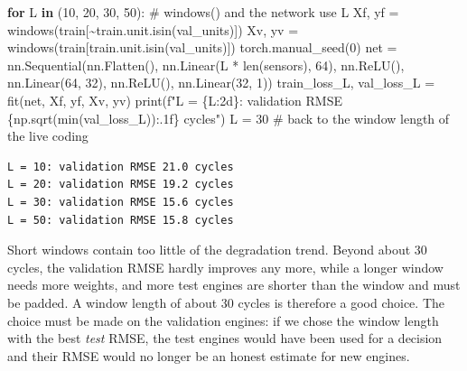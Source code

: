 \documentclass[
  letterpaper,
  DIV=11,
  numbers=noendperiod]{scrreprt}
\newenvironment{Shaded}{\begin{snugshade}}{\end{snugshade}}
\newcommand{\BuiltInTok}[1]{\textcolor[rgb]{0.00,0.23,0.31}{#1}}
\newcommand{\CommentTok}[1]{\textcolor[rgb]{0.37,0.37,0.37}{#1}}
\newcommand{\ControlFlowTok}[1]{\textcolor[rgb]{0.00,0.23,0.31}{\textbf{#1}}}
\newcommand{\DecValTok}[1]{\textcolor[rgb]{0.68,0.00,0.00}{#1}}
\newcommand{\KeywordTok}[1]{\textcolor[rgb]{0.00,0.23,0.31}{\textbf{#1}}}
\newcommand{\NormalTok}[1]{\textcolor[rgb]{0.00,0.23,0.31}{#1}}
\newcommand{\OperatorTok}[1]{\textcolor[rgb]{0.37,0.37,0.37}{#1}}
\newcommand{\SpecialCharTok}[1]{\textcolor[rgb]{0.37,0.37,0.37}{#1}}
\newcommand{\SpecialStringTok}[1]{\textcolor[rgb]{0.13,0.47,0.30}{#1}}
\begin{document}
\begin{tcolorbox}[enhanced jigsaw, left=2mm, title=\textcolor{quarto-callout-caution-color}{\faFire}\hspace{0.5em}{Solution to Exercise 2}, opacityback=0, breakable, rightrule=.15mm, arc=.35mm, toptitle=1mm, colbacktitle=quarto-callout-caution-color!10!white, opacitybacktitle=0.6, coltitle=black, colframe=quarto-callout-caution-color-frame, bottomrule=.15mm, leftrule=.75mm, bottomtitle=1mm, titlerule=0mm, toprule=.15mm, colback=white]

\begin{Shaded}
\begin{Highlighting}[]
\ControlFlowTok{for}\NormalTok{ L }\KeywordTok{in}\NormalTok{ (}\DecValTok{10}\NormalTok{, }\DecValTok{20}\NormalTok{, }\DecValTok{30}\NormalTok{, }\DecValTok{50}\NormalTok{):                       }\CommentTok{\# windows() and the network use L}
\NormalTok{    Xf, yf }\OperatorTok{=}\NormalTok{ windows(train[}\OperatorTok{\textasciitilde{}}\NormalTok{train.unit.isin(val\_units)])}
\NormalTok{    Xv, yv }\OperatorTok{=}\NormalTok{ windows(train[train.unit.isin(val\_units)])}
\NormalTok{    torch.manual\_seed(}\DecValTok{0}\NormalTok{)}
\NormalTok{    net }\OperatorTok{=}\NormalTok{ nn.Sequential(nn.Flatten(), nn.Linear(L }\OperatorTok{*} \BuiltInTok{len}\NormalTok{(sensors), }\DecValTok{64}\NormalTok{), nn.ReLU(),}
\NormalTok{                        nn.Linear(}\DecValTok{64}\NormalTok{, }\DecValTok{32}\NormalTok{), nn.ReLU(), nn.Linear(}\DecValTok{32}\NormalTok{, }\DecValTok{1}\NormalTok{))}
\NormalTok{    train\_loss\_L, val\_loss\_L }\OperatorTok{=}\NormalTok{ fit(net, Xf, yf, Xv, yv)}
    \BuiltInTok{print}\NormalTok{(}\SpecialStringTok{f"L = }\SpecialCharTok{\{}\NormalTok{L}\SpecialCharTok{:2d\}}\SpecialStringTok{: validation RMSE }\SpecialCharTok{\{}\NormalTok{np}\SpecialCharTok{.}\NormalTok{sqrt(}\BuiltInTok{min}\NormalTok{(val\_loss\_L))}\SpecialCharTok{:.1f\}}\SpecialStringTok{ cycles"}\NormalTok{)}
\NormalTok{L }\OperatorTok{=} \DecValTok{30}                                           \CommentTok{\# back to the window length of the live coding}
\end{Highlighting}
\end{Shaded}

\begin{verbatim}
L = 10: validation RMSE 21.0 cycles
L = 20: validation RMSE 19.2 cycles
L = 30: validation RMSE 15.6 cycles
L = 50: validation RMSE 15.8 cycles
\end{verbatim}

Short windows contain too little of the degradation trend. Beyond about
30 cycles, the validation RMSE hardly improves any more, while a longer
window needs more weights, and more test engines are shorter than the
window and must be padded. A window length of about 30 cycles is
therefore a good choice. The choice must be made on the validation
engines: if we chose the window length with the best \emph{test} RMSE,
the test engines would have been used for a decision and their RMSE
would no longer be an honest estimate for new engines.

\end{tcolorbox}
\end{document}
